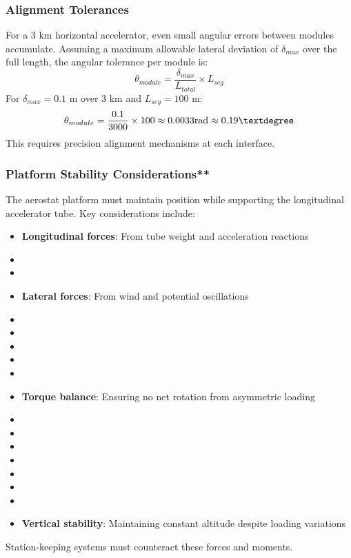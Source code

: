 \subsubsection{Alignment Tolerances}
For a 3 km horizontal accelerator, even small angular errors between modules accumulate. Assuming a maximum allowable lateral deviation of $\delta_{max}$ over the full length, the angular tolerance per module is:
\begin{equation}
\theta_{module} = \frac{\delta_{max}}{L_{total}} \times L_{seg}
\end{equation}
For $\delta_{max} = 0.1$ m over 3 km and $L_{seg} = 100$ m:
\begin{equation}
\theta_{module} = \frac{0.1}{3000} \times 100 \approx 0.0033  \text{rad} \approx 0.19\textdegree
\end{equation}
This requires precision alignment mechanisms at each interface.

\subsubsection{Platform Stability Considerations**}
The aerostat platform must maintain position while supporting the longitudinal accelerator tube. Key considerations include:
\begin{itemize}
    \item \textbf{Longitudinal forces}: From tube weight and acceleration reactions \cite{hoerner1965}
    \item \item \item \textbf{Lateral forces}: From wind and potential oscillations \cite{fung2002}
    \item \item \item \item \item \item \textbf{Torque balance}: Ensuring no net rotation from asymmetric loading \cite{meirovitch2001}
    \item \item \item \item \item \item \item \item \textbf{Vertical stability}: Maintaining constant altitude despite loading variations \cite{fung2002}
\end{itemize}
Station-keeping systems must counteract these forces and moments.

